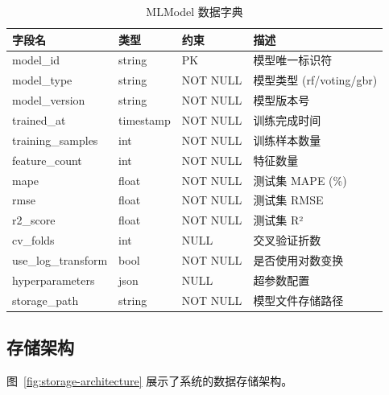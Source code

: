 \begin{table}[htbp]
    \centering
    \caption{MLModel 数据字典}
    \label{tab:dd-model}
    \begin{tabularx}{\textwidth}{@{}l l l X@{}}
        \toprule
        \textbf{字段名}        & \textbf{类型} & \textbf{约束} & \textbf{描述}          \\
        \midrule
        model\_id           & string      & PK          & 模型唯一标识符              \\
        model\_type         & string      & NOT NULL    & 模型类型 (rf/voting/gbr) \\
        model\_version      & string      & NOT NULL    & 模型版本号                \\
        trained\_at         & timestamp   & NOT NULL    & 训练完成时间               \\
        training\_samples   & int         & NOT NULL    & 训练样本数量               \\
        feature\_count      & int         & NOT NULL    & 特征数量                 \\
        mape                & float       & NOT NULL    & 测试集 MAPE (\%)        \\
        rmse                & float       & NOT NULL    & 测试集 RMSE             \\
        r2\_score           & float       & NOT NULL    & 测试集 R²               \\
        cv\_folds           & int         & NULL        & 交叉验证折数               \\
        use\_log\_transform & bool        & NOT NULL    & 是否使用对数变换             \\
        hyperparameters     & json        & NULL        & 超参数配置                \\
        storage\_path       & string      & NOT NULL    & 模型文件存储路径             \\
        \bottomrule
    \end{tabularx}
\end{table}

\subsection{存储架构}

图~\ref{fig:storage-architecture} 展示了系统的数据存储架构。

